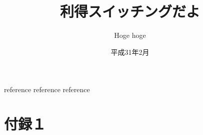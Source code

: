 \documentclass{jreport}
\title{利得スイッチングだよ}
\author{Hoge hoge}
\date{平成31年2月}
\begin{document}
\maketitle
%
\tableofcontents
\listoffigures
\listoftables






\begin{thebibliography}{99}
 reference
 reference
 reference
%
\end{thebibliography}


\appendix
\chapter{付録１}
\end{document}
